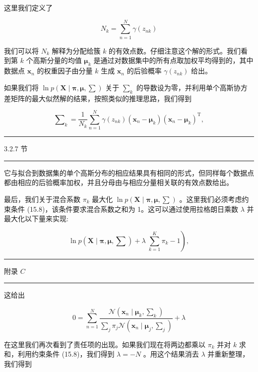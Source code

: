 \documentclass[10pt]{report}
\newcommand{\HRule}{\begin{center}\rule{0.9\linewidth}{0.2mm}\end{center}}
\begin{document}
这里我们定义了

\[
{N}_{k} = \mathop{\sum }\limits_{{n = 1}}^{N}\gamma \left( {z}_{nk}\right)  \tag{15.17}
\]

我们可以将 \({N}_{k}\) 解释为分配给簇 \(k\) 的有效点数。仔细注意这个解的形式。我们看到第 \(k\) 个高斯分量的均值 \({\mathbf{\mu }}_{k}\) 是通过对数据集中的所有点取加权平均得到的，其中数据点 \({\mathbf{x}}_{n}\) 的权重因子由分量 \(k\) 生成 \({\mathbf{x}}_{n}\) 的后验概率 \(\gamma \left( {z}_{nk}\right)\) 给出。

如果我们将 \(\ln p\left( {\mathbf{X} \mid  \mathbf{\pi },\mathbf{\mu },\mathbf{\sum }}\right)\) 关于 \({\mathbf{\sum }}_{k}\) 的导数设为零，并利用单个高斯协方差矩阵的最大似然解的结果，按照类似的推理思路，我们得到

\[
{\mathbf{\sum }}_{k} = \frac{1}{{N}_{k}}\mathop{\sum }\limits_{{n = 1}}^{N}\gamma \left( {z}_{nk}\right) \left( {{\mathbf{x}}_{n} - {\mathbf{\mu }}_{k}}\right) {\left( {\mathbf{x}}_{n} - {\mathbf{\mu }}_{k}\right) }^{\mathrm{T}}, \tag{15.18}
\]

\HRule

3.2.7 节

\HRule

它与拟合到数据集的单个高斯分布的相应结果具有相同的形式，但同样每个数据点都由相应的后验概率加权，并且分母由与相应分量相关联的有效点数给出。

最后，我们关于混合系数 \({\pi }_{k}\) 最大化 \(\ln p\left( {\mathbf{X} \mid  \mathbf{\pi },\mathbf{\mu },\mathbf{\sum }}\right)\) 。这里我们必须考虑约束条件 (15.8)，该条件要求混合系数之和为 1。这可以通过使用拉格朗日乘数 \(\lambda\) 并最大化以下量来实现:

\[
\left. {\ln p\left( {\mathbf{X} \mid  \mathbf{\pi },\mathbf{\mu },\mathbf{\sum }}\right)  + \lambda \;\mathop{\sum }\limits_{{k = 1}}^{K}{\pi }_{k} - 1}\right) , \tag{15.19}
\]

\HRule

附录 \(C\)

\HRule

这给出

\[
0 = \mathop{\sum }\limits_{{n = 1}}^{N}\frac{\mathcal{N}\left( {{\mathbf{x}}_{n} \mid  {\mathbf{\mu }}_{k},{\mathbf{\sum }}_{k}}\right) }{\mathop{\sum }\limits_{j}{\pi }_{j}\mathcal{N}\left( {{\mathbf{x}}_{n} \mid  {\mathbf{\mu }}_{j},{\mathbf{\sum }}_{j}}\right) } + \lambda  \tag{15.20}
\]

在这里我们再次看到了责任项的出现。如果我们现在将两边都乘以 \({\pi }_{k}\) 并对 \(k\) 求和，利用约束条件 (15.8)，我们得到 \(\lambda  =  - N\) 。用这个结果消去 \(\lambda\) 并重新整理，我们得到
\end{document}
